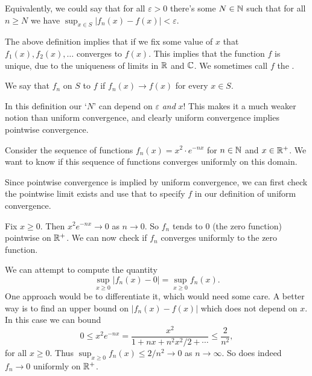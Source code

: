 \documentclass[a4paper]{scrartcl}
\begin{document}
\begin{center}
    

\end{center}


Equivalently, we could say that for all $\varepsilon > 0$ there's some $N \in \mathbb{N}$ such that for all $n \geq N$ we have $\sup_{x \in S} |f_n(x) - f(x)| < \varepsilon$.

The above definition implies that if we fix some value of $x$ that $f_1(x), f_2(x), \dots$ converges to $f(x)$. This implies that the function $f$ is unique, due to the uniqueness of limits in $\mathbb{R}$ and $\mathbb{C}$. We sometimes call $f$ the .

\begin{definition}
We say that $f_n$  on $S$ to $f$ if $f_n(x) \rightarrow f(x)$ for every $x \in S$.
\end{definition}
\begin{remark}
    In this definition our `$N$' can depend on $\varepsilon$ \emph{and} $x$! This makes it a much weaker notion than uniform convergence, and clearly uniform convergence implies pointwise convergence.
\end{remark}

\begin{example}
    Consider the sequence of functions $f_n(x) = x^2 \cdot e^{-n x}$ for $n \in \mathbb{N}$ and $x \in \mathbb{R}^+$. We want to know if this sequence of functions converges uniformly on this domain.

    Since pointwise convergence is implied by uniform convergence, we can first check the pointwise limit exists and use that to specify $f$ in our definition of uniform convergence.

    Fix $x \geq 0$. Then $x^2 e^{-nx} \rightarrow 0$ as $n \rightarrow 0$. So $f_n$ tends to $0$ (the zero function) pointwise on $\mathbb{R}^+$. We can now check if $f_n$ converges uniformly to the zero function.

    We can attempt to compute the quantity
    $$
    \sup_{x \geq 0} |f_n(x) - 0| =  \sup_{x \geq 0} f_n(x).
    $$
    One approach would be to differentiate it, which would need some care. A better way is to find an upper bound on $|f_n(x) - f(x)|$ which does not depend on $x$. In this case we can bound
    $$
    0 \leq x^2 e^{-nx} = \frac{x^2}{1 + nx + n^2x^2/2 + \cdots} \leq \frac{2}{n^2},
    $$
    for all $x \geq 0$. Thus $\sup_{x \geq 0} f_n(x) \leq 2/n^2 \rightarrow 0$ as $n \rightarrow \infty$. So does indeed $f_n \rightarrow 0$ uniformly on $\mathbb{R}^+$.
\end{example}
\end{document}
